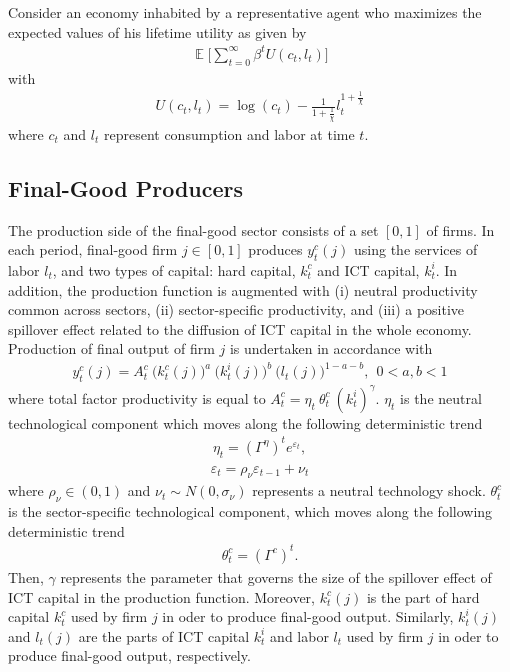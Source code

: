\documentclass[12pt]{article}
\DeclareMathOperator{\E}{\mathbb{E}}
\begin{document}
Consider an economy inhabited by a representative agent who maximizes the expected values of his lifetime utility as given by
\begin{eqnarray}\label{equation:utilFunc}
\E \Bigg[  \sum_{t=0}^{\infty} \beta^t U(c_t,l_t)  \Bigg]
\end{eqnarray}
with 
\begin{eqnarray*}
U(c_t,l_t) = \log(c_t) - \frac{1}{1+\frac{1}{\chi}} l_t^{1+\frac{1}{\chi}}
\end{eqnarray*}
where $c_t$ and $l_t$ represent consumption and labor at time $t$. 

\subsection{Final-Good Producers}

The production side of the final-good sector consists of a set $[0,1]$ of firms. In each period, final-good firm $j \in [0,1]$ produces $y^c_t(j)$ using the services of labor $l_{t}$, and two types of capital: hard capital, $k^c_{t}$ and ICT capital, $k^i_{t}$. In addition, the production function is augmented with (i) neutral productivity common across sectors, (ii) sector-specific productivity, and (iii) a positive spillover effect related to the diffusion of ICT capital in the whole economy. Production of final output of firm $j$ is undertaken in accordance with
\begin{eqnarray}\label{equation:production_FINAL}
y^c_t(j) = A^c_t \ \big( k^c_{t}(j) \big)^a \ \big( k^i_{t}(j) \big)^b \ \big( l_{t}(j) \big)^{1-a-b}, \ \ 0 < a,b < 1
\end{eqnarray}
where total factor productivity is equal to $ A_t^c = \eta_t \ \theta^c_t \ (k^i_{t})^{\gamma} $. $\eta_t$ is the neutral technological component which moves along the following deterministic trend
\begin{eqnarray}\label{equation:neutral_tech_process}
\eta_t = (\Gamma^{\eta})^t e^{\varepsilon_t},  
\end{eqnarray} 
\begin{eqnarray}\label{equation:neutral_tech_shock}
 \varepsilon_t = \rho_{\nu} \varepsilon_{t-1} + \nu_t
\end{eqnarray} 
where $\rho_{\nu} \in (0,1)$ and $\nu_t \sim N(0,\sigma_{\nu})$ represents a neutral technology shock. $\theta^c_t$ is the sector-specific technological component,  which moves along the following deterministic trend
\begin{eqnarray}
\theta_t^c = (\Gamma^{c})^t.
\end{eqnarray} 
Then, $\gamma$ represents the parameter that governs the size of the spillover effect of ICT capital in the production function. Moreover, $k^c_{t}(j)$ is the part of hard capital $k^c_t$ used by firm $j$ in oder to produce final-good output. Similarly, $k^i_{t}(j)$ and $l_{t}(j)$ are the parts of ICT capital $k^i_t$ and labor $l_t$ used by firm $j$ in oder to produce final-good output, respectively. 
\end{document}
